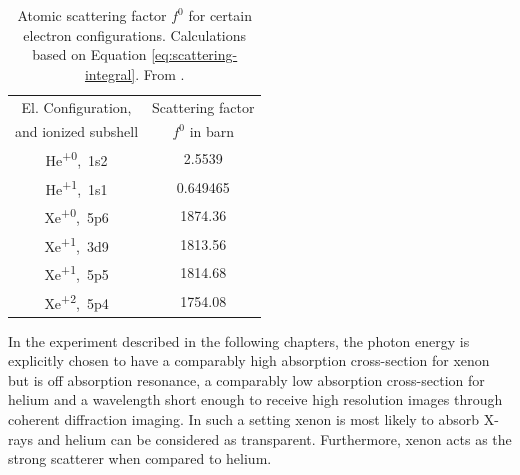\begin{table}
	\centering
		\begin{tabular}{ | c | c | }
		\hline
			El. Configuration, & Scattering factor \\
			and ionized subshell & $f^{0}$ in barn \\ \hline
			He\textsuperscript{+0},\ 1s2 & 2.5539  \\ \hline
			He\textsuperscript{+1},\ 1s1 & 0.649465  \\ \hline
			Xe\textsuperscript{+0},\ 5p6 & 1874.36  \\ \hline
			Xe\textsuperscript{+1},\ 3d9 & 1813.56  \\ \hline
			Xe\textsuperscript{+1},\ 5p5 & 1814.68  \\ \hline
			Xe\textsuperscript{+2},\ 5p4 & 1754.08  \\ \hline
		\end{tabular}
	\caption[Atomic scattering factors for helium and xenon.]{Atomic scattering factor $f^{0}$ for certain electron configurations. Calculations based on Equation \eqref{eq:scattering-integral}. From \cite{Ho-2016-PC}.}
	\label{tab:helium-xenon-el-scattering-crossection}
\end{table}
In the experiment described in the following chapters, the photon energy is explicitly chosen to have a comparably high absorption cross-section for xenon but is off absorption resonance, a comparably low absorption cross-section for helium and a wavelength short enough to receive high resolution images through coherent diffraction imaging. In such a setting xenon is most likely to absorb X-rays and helium can be considered as transparent. Furthermore, xenon acts as the strong scatterer when compared to helium.
%
%
%
%
%
